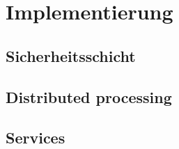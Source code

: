 \chapter{Implementierung}

\section{Sicherheitsschicht}

\section{Distributed processing}

\section{Services}
